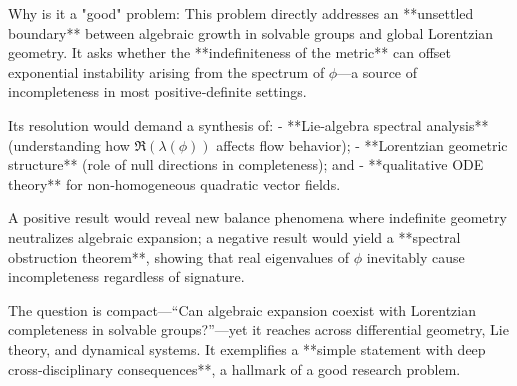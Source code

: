 Why is it a "good" problem:  
This problem directly addresses an **unsettled boundary** between algebraic growth in solvable groups and global Lorentzian geometry. It asks whether the **indefiniteness of the metric** can offset exponential instability arising from the spectrum of \(\phi\)—a source of incompleteness in most positive‑definite settings.  

Its resolution would demand a synthesis of:  
- **Lie‑algebra spectral analysis** (understanding how \(\Re(\lambda(\phi))\) affects flow behavior);  
- **Lorentzian geometric structure** (role of null directions in completeness); and  
- **qualitative ODE theory** for non‑homogeneous quadratic vector fields.  

A positive result would reveal new balance phenomena where indefinite geometry neutralizes algebraic expansion; a negative result would yield a **spectral obstruction theorem**, showing that real eigenvalues of \(\phi\) inevitably cause incompleteness regardless of signature.  

The question is compact—“Can algebraic expansion coexist with Lorentzian completeness in solvable groups?”—yet it reaches across differential geometry, Lie theory, and dynamical systems.  It exemplifies a **simple statement with deep cross‑disciplinary consequences**, a hallmark of a good research problem.
